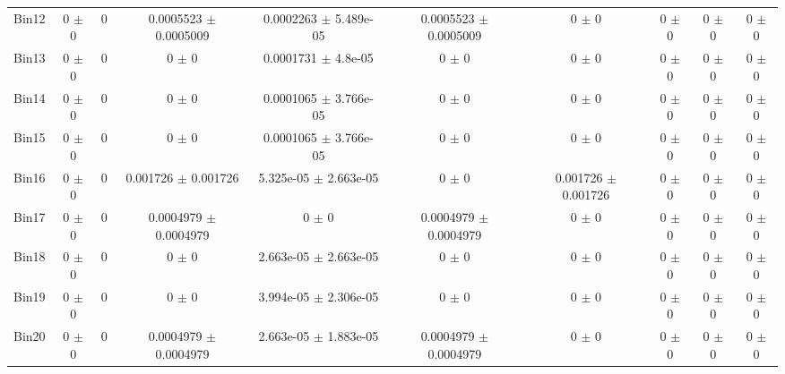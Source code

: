 \begin{tabular}{@{\extracolsep{4pt}}lccccccccc@{}}
     Bin12 & 0 $\pm$ 0 & 0 & 0.0005523 $\pm$ 0.0005009 & 0.0002263 $\pm$ 5.489e-05 & 0.0005523 $\pm$ 0.0005009 & 0 $\pm$ 0 & 0 $\pm$ 0 & 0 $\pm$ 0 & 0 $\pm$ 0 \\ 
     Bin13 & 0 $\pm$ 0 & 0 & 0 $\pm$ 0 & 0.0001731 $\pm$ 4.8e-05 & 0 $\pm$ 0 & 0 $\pm$ 0 & 0 $\pm$ 0 & 0 $\pm$ 0 & 0 $\pm$ 0 \\ 
     Bin14 & 0 $\pm$ 0 & 0 & 0 $\pm$ 0 & 0.0001065 $\pm$ 3.766e-05 & 0 $\pm$ 0 & 0 $\pm$ 0 & 0 $\pm$ 0 & 0 $\pm$ 0 & 0 $\pm$ 0 \\ 
     Bin15 & 0 $\pm$ 0 & 0 & 0 $\pm$ 0 & 0.0001065 $\pm$ 3.766e-05 & 0 $\pm$ 0 & 0 $\pm$ 0 & 0 $\pm$ 0 & 0 $\pm$ 0 & 0 $\pm$ 0 \\ 
     Bin16 & 0 $\pm$ 0 & 0 & 0.001726 $\pm$ 0.001726 & 5.325e-05 $\pm$ 2.663e-05 & 0 $\pm$ 0 & 0.001726 $\pm$ 0.001726 & 0 $\pm$ 0 & 0 $\pm$ 0 & 0 $\pm$ 0 \\ 
     Bin17 & 0 $\pm$ 0 & 0 & 0.0004979 $\pm$ 0.0004979 & 0 $\pm$ 0 & 0.0004979 $\pm$ 0.0004979 & 0 $\pm$ 0 & 0 $\pm$ 0 & 0 $\pm$ 0 & 0 $\pm$ 0 \\ 
     Bin18 & 0 $\pm$ 0 & 0 & 0 $\pm$ 0 & 2.663e-05 $\pm$ 2.663e-05 & 0 $\pm$ 0 & 0 $\pm$ 0 & 0 $\pm$ 0 & 0 $\pm$ 0 & 0 $\pm$ 0 \\ 
     Bin19 & 0 $\pm$ 0 & 0 & 0 $\pm$ 0 & 3.994e-05 $\pm$ 2.306e-05 & 0 $\pm$ 0 & 0 $\pm$ 0 & 0 $\pm$ 0 & 0 $\pm$ 0 & 0 $\pm$ 0 \\ 
     Bin20 & 0 $\pm$ 0 & 0 & 0.0004979 $\pm$ 0.0004979 & 2.663e-05 $\pm$ 1.883e-05 & 0.0004979 $\pm$ 0.0004979 & 0 $\pm$ 0 & 0 $\pm$ 0 & 0 $\pm$ 0 & 0 $\pm$ 0 \\ 
\hline\hline
  \end{tabular}
